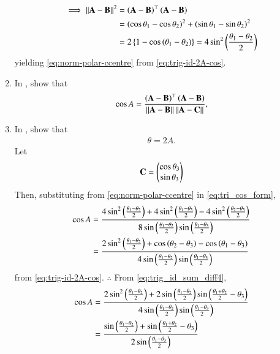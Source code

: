 \begin{enumerate}[label=\thesubsection.\arabic*.,ref=\thesubsection.\theenumi]
\begin{align}
\implies 
	  \left\lVert\mathbf{A}-\mathbf{B}\right\rVert^2 &= 
	  \left(\mathbf{A}-\mathbf{B}\right)^\top
	  \left(\mathbf{A}-\mathbf{B}\right) 
	  \\
	  &= 
	  \left(\cos \theta_1-\cos \theta_2\right)^2 +\left(\sin \theta_1-\sin \theta_2\right)^2
	  \\
	  &= 2\left\{1-
	  \cos \left(\theta_1-\theta_2\right)\right\} = 4 \sin^2 \left(\frac{\theta_1-\theta_2}{2}\right)
  \end{align}
  yielding 
\eqref{eq:norm-polar-ccentre} from
\eqref{eq:trig-id-2A-cos}.
  \item In 
	, show that 
\begin{align}
	\cos A = \frac{
	  \left(\mathbf{A}-\mathbf{B}\right)^\top
	  \left(\mathbf{A}-\mathbf{B}\right) 
}
{
	  \left\lVert\mathbf{A}-\mathbf{B}\right\rVert
	  \left\lVert\mathbf{A}-\mathbf{C}\right\rVert
}
\label{eq:tri_cos_form-ccentre-norm},
\end{align}
  \item In 
	,
show that 
  \begin{align}
	  \theta = 2A
\label{eq:ang-subtend-ccentre}.
  \end{align}
  \solution Let 
  \begin{align}
	  \mathbf{C} = \begin{pmatrix}\cos \theta_3 \\ \sin \theta_3\end{pmatrix}
  \end{align}
  Then, 
  substituting 
  from 
\eqref{eq:norm-polar-ccentre}
in 
\eqref{eq:tri_cos_form},
  \begin{align}
	  \cos A &= \frac{4 \sin^2 \left(\frac{\theta_1-\theta_2}{2}\right) +4\sin^2 \left(\frac{\theta_1-\theta_3}{2}\right)-4 \sin^2 \left(\frac{\theta_2-\theta_3}{2}\right)}{8 \sin \left(\frac{\theta_1-\theta_2}{2}\right) \sin \left(\frac{\theta_1-\theta_3}{2}\right)}
	  \\
	   &= \frac{2 \sin^2 \left(\frac{\theta_1-\theta_2}{2}\right) +\cos \left({\theta_2-\theta_3}\right)- \cos \left({\theta_1-\theta_3}\right)}{4 \sin \left(\frac{\theta_1-\theta_2}{2}\right) \sin \left(\frac{\theta_1-\theta_3}{2}\right)}
  \end{align}
  from 
\eqref{eq:trig-id-2A-cos}. $\therefore$ From 
\eqref{eq:trig_id_sum_diff4},
  \begin{align}
	   \cos A &= \frac{2 \sin^2 \brak{\frac{\theta_1-\theta_2}{2}} +2\sin \brak{\frac{\theta_1-\theta_2}{2}}\sin \brak{\frac{\theta_1+\theta_2}{2}-\theta_3}}{4 \sin \brak{\frac{\theta_1-\theta_2}{2}} \sin \brak{\frac{\theta_1-\theta_3}{2}}}
	  \\
	   &= \frac{ \sin \brak{\frac{\theta_1-\theta_2}{2}} +\sin \brak{\frac{\theta_1+\theta_2}{2}-\theta_3}}{ 2\sin\brak{\frac{\theta_1-\theta_3}{2}}}

\end{align}
\end{enumerate}
